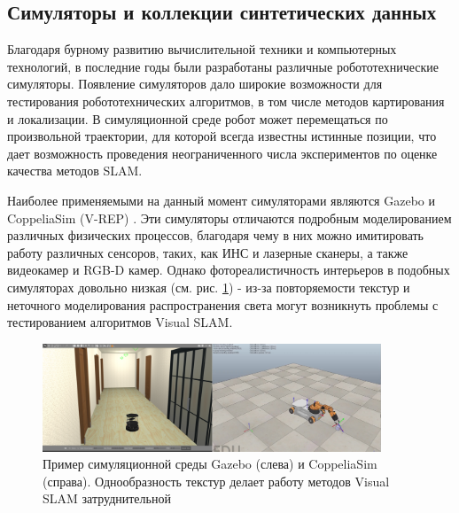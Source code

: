 \documentclass{mipt-thesis-ms}
\begin{document}
	\subsection{Симуляторы и коллекции синтетических данных}
	\label{section_synthetic_datasets}
	
	Благодаря бурному развитию вычислительной техники и компьютерных технологий, в последние годы были разработаны различные робототехнические симуляторы. Появление симуляторов дало широкие возможности для тестирования робототехнических алгоритмов, в том числе методов картирования и локализации. В симуляционной среде робот может перемещаться по произвольной траектории, для которой всегда известны истинные позиции, что дает возможность проведения неограниченного числа экспериментов по оценке качества методов SLAM.
	
	Наиболее применяемыми на данный момент симуляторами являются Gazebo \cite{koenig2004design} и CoppeliaSim (V-REP) \cite{rooban2021coppeliasim}. Эти симуляторы отличаются подробным моделированием различных физических процессов, благодаря чему в них можно имитировать работу различных сенсоров, таких, как ИНС и лазерные сканеры, а также видеокамер и RGB-D камер. Однако фотореалистичность интерьеров в подобных симуляторах довольно низкая (см. рис. \ref{figure_gazebo_vrep}) - из-за повторяемости текстур и неточного моделирования распространения света могут возникнуть проблемы с тестированием алгоритмов Visual SLAM.
	
	\begin{figure}
		\centering
		\includegraphics[width=0.9\textwidth]{img/gazebo_vrep.png}
		\caption{Пример симуляционной среды Gazebo (слева) и CoppeliaSim (справа). Однообразность текстур делает работу методов Visual SLAM затруднительной}
		\label{figure_gazebo_vrep}
	\end{figure}
\end{document}
